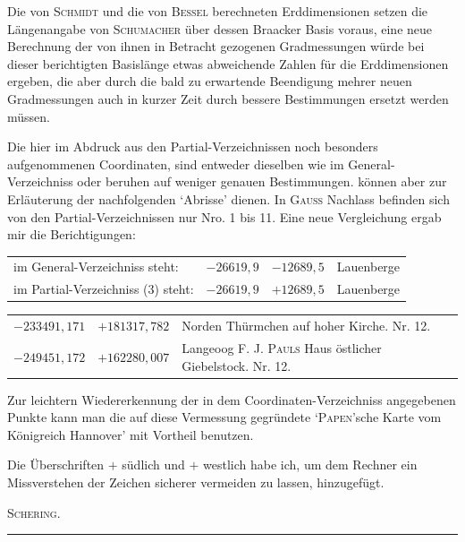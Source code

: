 Die von \textsc{Schmidt} und die von \textsc{Bessel} berechneten Erddimensionen setzen die Längenangabe von \textsc{Schumacher} über dessen Braacker Basis voraus, eine neue Berechnung der von ihnen in Betracht gezogenen Gradmessungen würde bei dieser berichtigten Basislänge etwas abweichende Zahlen für die Erddimensionen ergeben, die aber durch die bald zu erwartende Beendigung mehrer neuen Gradmessungen auch in kurzer Zeit durch bessere Bestimmungen ersetzt werden müssen.

Die hier im Abdruck aus den Partial-Verzeichnissen noch besonders aufgenommenen Coordinaten, sind entweder dieselben wie im General-Verzeichniss oder beruhen auf weniger genauen Bestimmungen. können aber zur Erläuterung der nachfolgenden ‘Abrisse’ dienen. In \textsc{Gauss} Nachlass befinden sich von den Partial-Verzeichnissen nur Nro. 1 bis 11. Eine neue Vergleichung ergab mir die Berichtigungen:
\begin{center}\small\begin{tabular}{@{}p{.39\linewidth}rrp{.16\linewidth}@{}}
im General-Verzeichniss steht:&\(-26619{,}9\)&\(-12689{,}5\)&Lauenberge\\
im Partial-Verzeichniss (3) steht:&\(-26619{,}9\)&\(+12689{,}5\)&Lauenberge
\end{tabular}\end{center}
\begin{center}\begin{tabular}{@{}rrp{.55\linewidth}@{}}
\(-233491{,}171\)&\(+181317{,}782\)&Norden Thürmchen auf hoher Kirche. Nr. 12.\\
\(-249451{,}172\)&\(+162280{,}007\)&Langeoog F. J. \textsc{Pauls} Haus östlicher Giebelstock. Nr. 12.
\end{tabular}\end{center}

Zur leichtern Wiedererkennung der in dem Coordinaten-Verzeichniss angegebenen Punkte kann man die auf diese Vermessung gegründete ‘\textsc{Papen}’sche Karte vom Königreich Hannover’ mit Vortheil benutzen.

Die Überschriften \(+\) südlich und \(+\) westlich habe ich, um dem Rechner ein Missverstehen der Zeichen sicherer vermeiden zu lassen, hinzugefügt.
\begin{flushright}\textsc{Schering.}\end{flushright}
\begin{center}\rule{.23\linewidth}{.3pt}\end{center}
